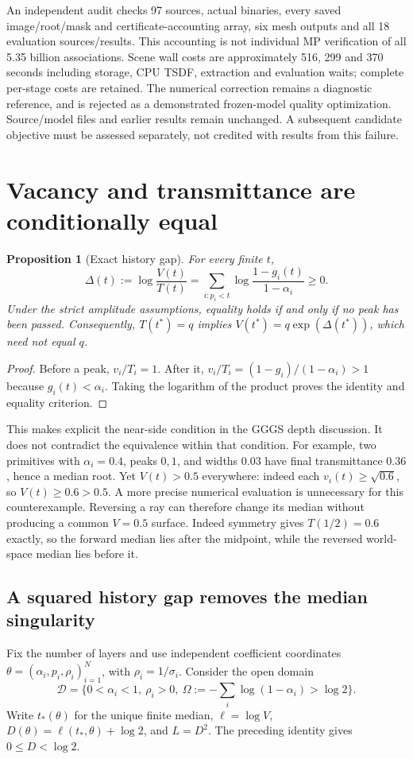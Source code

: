 \documentclass[11pt,a4paper]{article}
\newtheorem{proposition}[theorem]{Proposition}
\begin{document}
An independent audit checks 97 sources, actual binaries, every saved
image/root/mask and certificate-accounting array, six mesh outputs and
all 18 evaluation sources/results. This accounting is not individual MP
verification of all 5.35 billion associations. Scene wall costs are
approximately 516, 299 and 370 seconds including storage, CPU TSDF,
extraction and evaluation waits; complete per-stage costs are retained.
The numerical correction remains a diagnostic reference, and is rejected
as a demonstrated frozen-model quality optimization. Source/model files
and earlier results remain unchanged. A subsequent candidate objective
must be assessed separately, not credited with results from this failure.

\section{Vacancy and transmittance are conditionally equal}
\begin{proposition}[Exact history gap]
For every finite $t$,
\[
 \Delta(t):=\log\frac{V(t)}{T(t)}
 =\sum_{i:p_i<t}\log\frac{1-g_i(t)}{1-\alpha_i}\geq0.
\]
Under the strict amplitude assumptions, equality holds if and only if no peak
has been passed. Consequently, $T(t^*)=q$ implies
$V(t^*)=q\exp(\Delta(t^*))$, which need not equal $q$.
\end{proposition}
\begin{proof}
Before a peak, $v_i/T_i=1$. After it,
$v_i/T_i=(1-g_i)/(1-\alpha_i)>1$ because $g_i(t)<\alpha_i$.
Taking the logarithm of the product proves the identity and equality criterion.
\end{proof}
This makes explicit the near-side condition in the GGGS depth discussion.
It does not contradict the equivalence within that condition.
For example, two primitives with $\alpha_i=0.4$, peaks $0,1$, and widths
$0.03$ have final transmittance $0.36$, hence a median root. Yet
$V(t)>0.5$ everywhere: indeed each $v_i(t)\geq\sqrt{0.6}$, so
$V(t)\geq0.6>0.5$. A more precise numerical evaluation is unnecessary for
this counterexample. Reversing a ray can therefore change its median without
producing a common $V=0.5$ surface.
Indeed symmetry gives $T(1/2)=0.6$ exactly, so the forward median lies after
the midpoint, while the reversed world-space median lies before it.

\subsection{A squared history gap removes the median singularity}
Fix the number of layers and use independent coefficient coordinates
$\theta=(\alpha_i,p_i,\rho_i)_{i=1}^N$, with $\rho_i=1/\sigma_i$.
Consider the open domain
\[
 \mathcal D=\{0<\alpha_i<1,\ \rho_i>0,\
 \Omega:=-\textstyle\sum_i\log(1-\alpha_i)>\log2\}.
\]
Write $t_*(\theta)$ for the unique finite median,
$\ell=\log V$, $D(\theta)=\ell(t_*,\theta)+\log2$, and $L=D^2$.
The preceding identity gives $0\leq D<\log2$.
\end{document}
